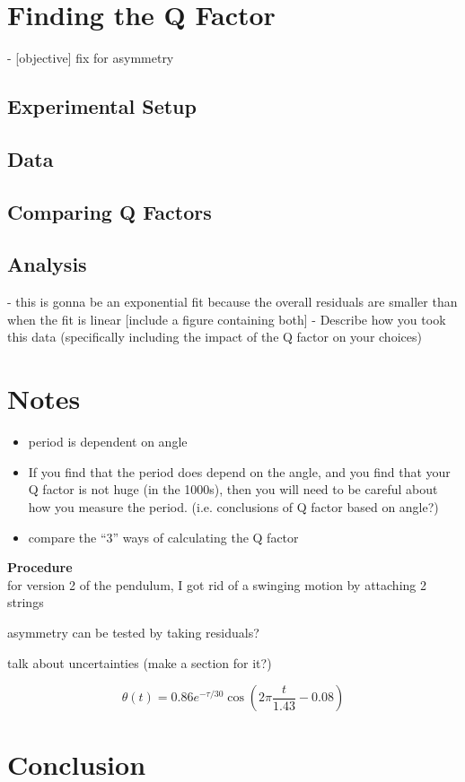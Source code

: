 \documentclass[12pt]{article}
\begin{document}
\section{Finding the Q Factor}
- [objective] fix for asymmetry

\subsection{Experimental Setup}
\subsection{Data}
\subsection{Comparing Q Factors}
\subsection{Analysis}
- this is gonna be an exponential fit because the overall residuals are smaller than when the fit is linear [include a figure containing both]
- Describe how you took this data (specifically including the impact of the Q factor on your choices)

\section{Notes}


\begin{itemize}
    \item period is dependent on angle \cite*{what-is-yeast}
    \item If you find that the period does depend on the angle, and you find that your Q factor is not huge (in the 1000s), then you will need to be careful about how you measure the period. (i.e. conclusions of Q factor based on angle?)
    \item compare the ``3'' ways of calculating the Q factor
\end{itemize}


\textbf{Procedure}\\
for version 2 of the pendulum, I got rid of a swinging motion by attaching 2 strings

asymmetry can be tested by taking residuals?

talk about uncertainties (make a section for it?)

\begin{equation}
    \theta(t) = 0.86 e^{-\tau/30} \cos\left(2 \pi \frac{t}{1.43} - 0.08\right)
\end{equation}

\section*{Conclusion}
\nocite{*}

\newpage

\printbibliography
\end{document}
